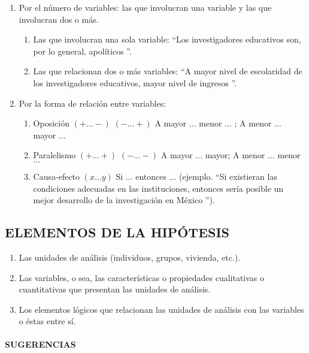 \begin{enumerate}
 \item Por el número de variables: las que involucran una variable y las que involucran dos o más.
    \begin{enumerate}
      \item Las que involucran una sola variable: \textquotedblleft Los investigadores educativos son, por lo general, apolíticos \textquotedblright.
      \item Las que relacionan dos o más variables: \textquotedblleft A mayor nivel de escolaridad de los investigadores educativos, mayor nivel de ingresos \textquotedblright.
    \end{enumerate}
 
\item Por la forma de relación entre variables:

\begin{enumerate}
 \item Oposición $(+ \ldots -)$  $(- \ldots +)$    A mayor $ \ldots $ menor $ \ldots $ ;   A menor $ \ldots $ mayor $ \ldots $
 \item Paralelismo $(+ \ldots +)$   $(- \ldots -)$   A mayor $ \ldots $ mayor;    A menor $ \ldots $ menor $ \ldots $
 \item Causa-efecto  $(x \ldots y)$  Si $ \ldots $ entonces $ \ldots $ (ejemplo.  \textquotedblleft Si existieran las condiciones adecuadas en las instituciones, entonces sería posible un mejor desarrollo de la investigación en México \textquotedblright).
\end{enumerate}

\end{enumerate}

\subsection{ELEMENTOS DE LA HIPÓTESIS}

\begin{enumerate}
 \item Las unidades de análisis (individuos, grupos, vivienda, etc.).
 \item Las variables, o sea, las características o propiedades cualitativas o cuantitativas que presentan las unidades de análisis.
 \item Los elementos lógicos que relacionan las unidades de análisis con las variables o éstas entre sí.
\end{enumerate}


\paragraph{SUGERENCIAS}

